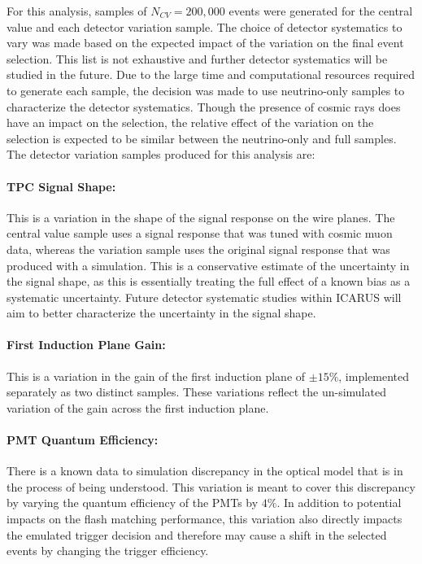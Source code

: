 For this analysis, samples of $N_{CV} = 200,000$ events were generated for the central value and each detector variation sample. The choice of detector systematics to vary was made based on the expected impact of the variation on the final event selection. This list is not exhaustive and further detector systematics will be studied in the future. Due to the large time and computational resources required to generate each sample, the decision was made to use neutrino-only samples to characterize the detector systematics. Though the presence of cosmic rays does have an impact on the selection, the relative effect of the variation on the selection is expected to be similar between the neutrino-only and full samples. The detector variation samples produced for this analysis are:

\paragraph{TPC Signal Shape:}
This is a variation in the shape of the signal response on the wire planes. The central value sample uses a signal response that was tuned with cosmic muon data, whereas the variation sample uses the original signal response that was produced with a simulation. This is a conservative estimate of the uncertainty in the signal shape, as this is essentially treating the full effect of a known bias as a systematic uncertainty. Future detector systematic studies within ICARUS will aim to better characterize the uncertainty in the signal shape.

\paragraph{First Induction Plane Gain:}
This is a variation in the gain of the first induction plane of $\pm 15\%$, implemented separately as two distinct samples. These variations reflect the un-simulated variation of the gain across the first induction plane.

\paragraph{PMT Quantum Efficiency:}
There is a known data to simulation discrepancy in the optical model that is in the process of being understood. This variation is meant to cover this discrepancy by varying the quantum efficiency of the PMTs by $4\%$. In addition to potential impacts on the flash matching performance, this variation also directly impacts the emulated trigger decision and therefore may cause a shift in the selected events by changing the trigger efficiency.

